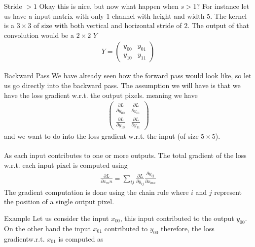 \begin{parag}{Stride $> 1$}
	Okay this is nice, but now what happen when $s > 1$? For instance let us have a input matrix with only 1 channel with height and width 5. The kernel is a $3 \times 3$ of size with both vertical and horizontal stride of $2$. The output of that convolution would be a $2 \times 2$ $Y$ 
	\begin{align*} 
		Y = \begin{pmatrix} y_{00} & y_{01} \\ y_{10} & y_{11} \end{pmatrix} 
	\end{align*}
\end{parag}
\begin{parag}{Backward Pass}
    We have already seen how the forward pass would look like, so let us go directly into the backward pass. The assumption we will have is that we have the loss gradient w.r.t. the output pixels. meaning we have 
	\begin{align*} 
		\begin{pmatrix} \frac{\partial L}{\partial y_{00}}  & \frac{\partial L}{\partial y_{01}}  \\ \frac{\partial L}{\partial y_{10}}  & \frac{\partial L}{\partial y_{11}}  \end{pmatrix} 
	\end{align*}
	and we want to do into the loss gradient w.r.t. the input (of size $5 \times 5$).\\
	$ $\\
	As each input contributes to one or more outputs. The total gradient of the loss w.r.t. each input pixel is computed using 
	\begin{align*} 
		\frac{\partial L}{\partial x_mn} = \sum_{ij} \frac{\partial L}{\partial y_{ij}} \frac{\partial y_{ij}}{\partial x_{mn}} 
	\end{align*}
	The gradient computation is done using the chain rule where $i$ and $j$ represent the position of a single output pixel.
	\begin{subparag}{Example}
	    Let us consider the input $x_{00}$, this input contributed to the output $y_{00}$. On the other hand the input $x_{01}$ contributed to $y_{00}$ therefore, the loss gradientw.r.t. $x_{01}$ is computed as 


\end{subparag}
\end{parag}
